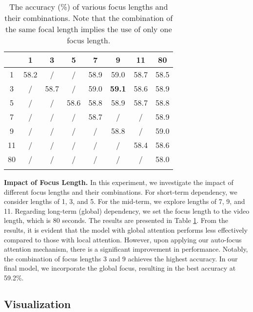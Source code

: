 \begin{table}[t]
\caption{The accuracy (\%) of various focus lengths and their combinations. Note that the combination of the same focal length implies the use of only one focus length.} 
\label{fs}

\begin{tabular}{c|ccc|ccc|c}
\toprule
   & 1 & 3 & 5 & 7 & 9 & 11 & 80   \\ \midrule
1  & \cellcolor[HTML]{C0C0C0}58.2& / & / & 58.9& 59.0& 58.7& 58.5\\
3  & / & \cellcolor[HTML]{C0C0C0}58.7& / & 59.0& \textbf{59.1}& 58.6& 58.9\\
5  & / & / & \cellcolor[HTML]{C0C0C0}58.6& 58.8& 58.9& 58.7& 58.8\\ \midrule
7  & / & / & / & \cellcolor[HTML]{C0C0C0}58.7& / & /  & 58.9\\
9  & / & / & / & / & \cellcolor[HTML]{C0C0C0}58.8& /  & 59.0\\
11 & / & / & / & / & / & \cellcolor[HTML]{C0C0C0}58.4& 58.6\\ \midrule
80 & / & / & / & / & / & /  & \cellcolor[HTML]{C0C0C0}58.0 \\ \botrule
\end{tabular}
\end{table}

\noindent\textbf{Impact of Focus Length.} In this experiment, we investigate the impact of different focus lengths and their combinations. For short-term dependency, we consider lengths of 1, 3, and 5. For the mid-term, we explore lengths of 7, 9, and 11. Regarding long-term (global) dependency, we set the focus length to the video length, which is 80 seconds. The results are presented in Table \ref{fs}.
From the results, it is evident that the model with global attention performs less effectively compared to those with local attention. However, upon applying our auto-focus attention mechanism, there is a significant improvement in performance. Notably, the combination of focus lengths 3 and 9 achieves the highest accuracy. In our final model, we incorporate the global focus, resulting in the best accuracy at 59.2\%.

\subsection{Visualization}

